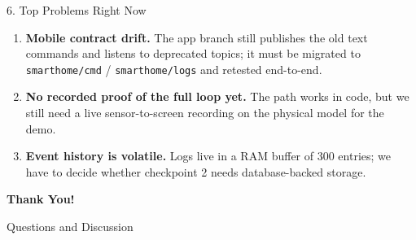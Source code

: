 \documentclass[aspectratio=169,11pt]{beamer}
\begin{document}
\begin{frame}{6. Top Problems Right Now}
  \small
  \begin{enumerate}
    \item \textbf{Mobile contract drift.} The app branch still publishes the
      old text commands and listens to deprecated topics; it must be migrated
      to \texttt{smarthome/cmd} / \texttt{smarthome/logs} and retested
      end-to-end.
    \item \textbf{No recorded proof of the full loop yet.} The path works in
      code, but we still need a live sensor-to-screen recording on the
      physical model for the demo.
    \item \textbf{Event history is volatile.} Logs live in a RAM buffer of
      300 entries; we have to decide whether checkpoint 2 needs
      database-backed storage.
  \end{enumerate}
\end{frame}

\begin{frame}[plain]
  \centering
  \vfill
  {\Huge\bfseries\color{DeepBlue} Thank You!}\par
  \vspace{0.4cm}
  {\large Questions and Discussion}
  \vfill
\end{frame}
\end{document}

